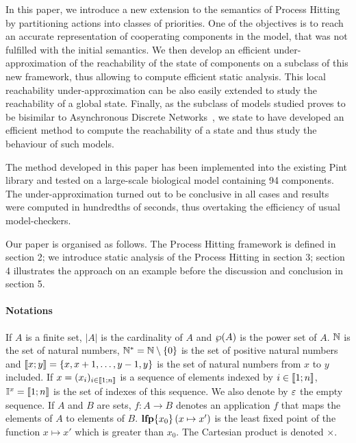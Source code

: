 In this paper, we introduce a new extension to the semantics of Process Hitting by partitioning actions into classes of priorities.
One of the objectives is to reach an accurate representation of cooperating components in the model, that was not fulfilled with the initial semantics.
We then develop an efficient under-approximation of the reachability of the state of components on a subclass of this new framework, thus allowing to compute efficient static analysis.
This local reachability under-approximation can be also easily extended to study the reachability of a global state.
Finally, as the subclass of models studied proves to be bisimilar to Asynchronous Discrete Networks~\cite{kauffman69,Thomas73,deJong02}, we state to have developed an efficient method to compute the reachability of a state and thus study the behaviour of such models.

The method developed in this paper has been implemented into the existing Pint library and tested on a large-scale biological model containing 94 components.
The under-approximation turned out to be conclusive in all cases and results were computed in hundredths of seconds,
thus overtaking the efficiency of usual model-checkers.



Our paper is organised as follows.
The Process Hitting framework is defined in section 2;
we introduce static analysis of the Process Hitting in section 3;
section 4 illustrates the approach on an example
before the discussion and conclusion in section 5. 



\paragraph*{Notations}

If $A$ is a finite set,
$|A|$ is the cardinality of $A$
and $\wp(A)$ is the power set of $A$.
$\mathbb{N}$ is the set of natural numbers,
$\mathbb{N}^* = \mathbb{N} \setminus \{ 0 \}$ is the set of positive natural numbers
and $\llbracket x; y \rrbracket = \{ x, x+1, \dots, y-1, y \}$ is the set of natural numbers from $x$ to $y$ included.
If $x = (x_i)_{i \in \llbracket 1; n \rrbracket}$ is a sequence of elements indexed by $i \in \llbracket 1; n \rrbracket$,
$\mathbb{I}^{x} = \llbracket 1; n \rrbracket$ is the set of indexes of this sequence.
We also denote by $\varepsilon$ the empty sequence.
If $A$ and $B$ are sets,
$f : A \rightarrow B$ denotes an application $f$ that maps the elements of $A$ to elements of $B$.
$\mathbf{lfp}\{x_0\}\left(x\mapsto x'\right)$ is the least fixed point of the function $x \mapsto x'$ which is greater than $x_0$.
The Cartesian product is denoted $\times$.
